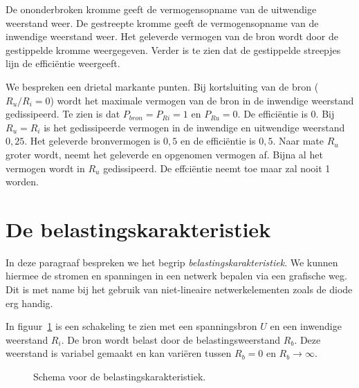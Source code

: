 De ononderbroken kromme geeft de vermogensopname van de uitwendige weerstand weer. De gestreepte
kromme geeft de vermogensopname van de inwendige weerstand weer. Het geleverde vermogen van de
bron wordt door de gestippelde kromme weergegeven. Verder is te zien dat de gestippelde
streepjes lijn de effici\"entie weergeeft.

We bespreken een drietal markante punten.
Bij kortsluiting van de bron ($R_u/R_i=0$) wordt het maximale vermogen van de bron in de inwendige
weerstand gedissipeerd. Te zien is dat $P_{bron} = P_{Ri} = 1$ en $P_{Ru} = 0$. De effici\"entie is 0.
Bij $R_u=R_i$ is het gedissipeerde vermogen in de inwendige en uitwendige weerstand $0,25$. Het geleverde
bronvermogen is $0,5$ en de effici\"entie is $0,5$. Naar mate $R_u$ groter wordt, neemt het geleverde
en opgenomen vermogen af. Bijna al het vermogen wordt in $R_u$ gedissipeerd. De effci\"entie neemt toe
maar zal nooit 1 worden.


\section{De belastingskarakteristiek}

In deze paragraaf bespreken we het begrip \textsl{belastingskarakteristiek}. We kunnen hiermee de stromen
en spanningen in een netwerk bepalen via een grafische weg. Dit is met name bij het gebruik van niet-lineaire
netwerkelementen zoals de diode erg handig.

In figuur~\ref{fig:gelschemavoorbelastingskarakteristiek} is een schakeling te zien met een spanningsbron
$U$ en een inwendige weerstand $R_i$. De bron wordt belast door de belastingsweerstand $R_b$. Deze weerstand
is variabel gemaakt en kan vari\"eren tussen $R_b = 0$ en $R_b \rightarrow \infty$.

\begin{figure}[!ht]
\centering
{}
\captionsetup{width=.9\linewidth}
\caption{Schema voor de belastingskarakteristiek.}
\label{fig:gelschemavoorbelastingskarakteristiek}
\end{figure}

